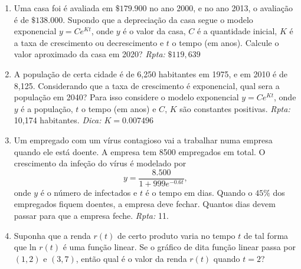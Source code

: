 \documentclass[11pt]{article}
\begin{document}
\begin{enumerate}
     \item Uma casa foi é avaliada em $\$ 179.900$ no ano 2000, 
     e no ano 2013, o avaliação é de $\$ 138.000$. 
     Supondo que a depreciação da casa segue o modelo exponencial 
      $y=Ce^{Kt}$, onde $y$ é o valor da casa, $C$ é a quantidade inicial, $K$ é a taxa de crescimento ou decrescimento e $t$ o tempo (em anos). Calcule o valor aproximado da casa em 2020? 
     \hfill {\it Rpta:} $\$ 119,639$  
         
             
     \item A população de certa cidade é de 6,250 habitantes em 1975, e em 2010 é de 8,125. 
     Considerando que a taxa de crescimento é exponencial, qual sera a população em 2040? Para isso considere o modelo exponencial 
     $y=Ce^{Kt}$, onde $y$ é a população, $t$ o tempo (em anos) e 
     $C$, $K$ são constantes positivas. \hfill {\it Rpta:} 10,174
     habitantes. 
     {\it Dica: $K=0.007496$}
         
     \item Um empregado com um vírus contagioso vai a trabalhar numa empresa quando ele está doente. A empresa tem 
     8500 empregados em total. 
     O crescimento da infeção do vírus é modelado por 
     $$ y=\frac{8.500}{1+999e^{-0.6t}}, $$
     onde $y$ é o número de infectados e $t$ é o tempo em dias.
     Quando o $45\%$ dos empregados fiquem doentes, a empresa deve fechar. 
     Quantos dias 
     devem passar para que a 
     empresa feche.    
     \hfill {\it Rpta:} 11.               
     
     \item Suponha que a renda $r(t)$ de certo produto varia no tempo $t$ de tal forma que $\text{ln } r(t)$ é uma função linear. Se o gráfico de dita função linear passa por $(1, 2)$ e 
     $(3, 7)$, então qual é o valor da renda $r(t)$ quando $t=2$?                                            
    \end{enumerate}            
\end{document}
